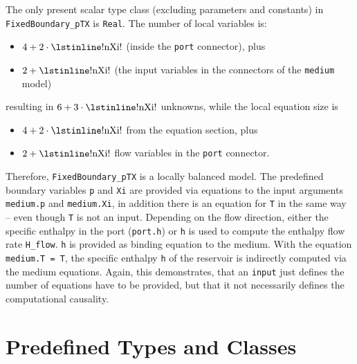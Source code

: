 \begin{example}
The only present scalar type class (excluding parameters and constants) in \lstinline!FixedBoundary_pTX! is \lstinline!Real!.
The number of local variables is:
\begin{itemize}
\item
  $4 + 2 \cdot \text{\lstinline!nXi!}$ (inside the \lstinline!port! connector), plus
\item
  $2 + \text{\lstinline!nXi!}$ (the input variables in the connectors of the \lstinline!medium! model)
\end{itemize}
resulting in $6 + 3 \cdot \text{\lstinline!nXi!}$ unknowns, while the local equation size is
\begin{itemize}
\item
  $4 + 2 \cdot \text{\lstinline!nXi!}$ from the equation section, plus
\item
  $2 + \text{\lstinline!nXi!}$ flow variables in the \lstinline!port! connector.
\end{itemize}

Therefore, \lstinline!FixedBoundary_pTX! is a locally balanced model.
The predefined boundary variables \lstinline!p! and \lstinline!Xi! are provided via equations to the input arguments \lstinline!medium.p! and \lstinline!medium.Xi!, in addition there is an equation for \lstinline!T! in the same way -- even though \lstinline!T! is not an input.
Depending on the flow direction, either the specific enthalpy in the port (\lstinline!port.h!) or \lstinline!h! is used to compute the enthalpy flow rate \lstinline!H_flow!.
\lstinline!h! is provided as binding equation to the medium.
With the equation \lstinline!medium.T = T!, the specific enthalpy \lstinline!h! of the reservoir is indirectly computed via the medium equations.
Again, this demonstrates, that an \lstinline!input! just defines the number of equations have to be provided, but that it not necessarily defines the computational causality.
\end{example}

\section{Predefined Types and Classes}\label{predefined-types-and-classes}


